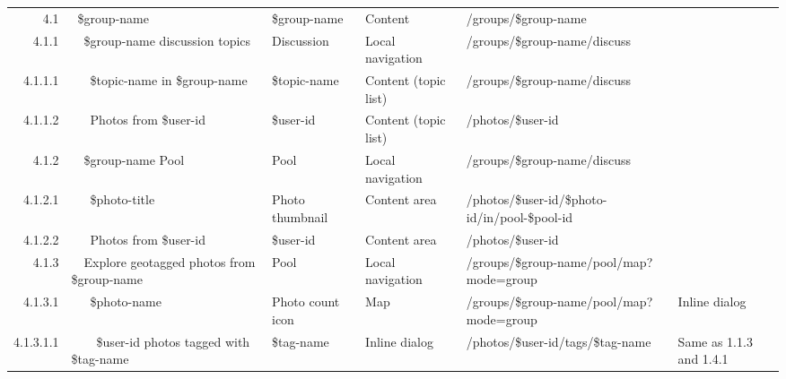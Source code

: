 \documentclass[12pt,a4paper]{article}
\begin{document}
\begin{landscape}
\begin{table}[h!b!p!]
\begin{center}
\begin{tiny}
\begin{tabular}{r|l|l|l|l|p{3cm}}
              4.1 &
              ~\$group-name &
              \$group-name &
              Content &
              /groups/\$group-name &
              \\

                4.1.1 &
                ~~\$group-name discussion topics &
                Discussion &
                Local navigation &
                /groups/\$group-name/discuss &
                \\

                  4.1.1.1 &
                  ~~~\$topic-name in \$group-name &
                  \$topic-name &
                  Content (topic list) &
                  /groups/\$group-name/discuss &
                  \\

                  4.1.1.2 &
                  ~~~Photos from \$user-id &
                  \$user-id &
                  Content (topic list) &
                  /photos/\$user-id &
                  \\

                4.1.2 &
                ~~\$group-name Pool &
                Pool &
                Local navigation &
                /groups/\$group-name/discuss &
                \\

                  4.1.2.1 &
                  ~~~\$photo-title &
                  Photo thumbnail &
                  Content area &
                  /photos/\$user-id/\$photo-id/in/pool-\$pool-id &
                  \\

                  4.1.2.2 &
                  ~~~Photos from \$user-id &
                  \$user-id &
                  Content area &
                  /photos/\$user-id &
                  \\

                4.1.3 &
                ~~Explore geotagged photos from \$group-name  &
                Pool &
                Local navigation &
                /groups/\$group-name/pool/map?mode=group &
                \\

                  4.1.3.1 &
                  ~~~\$photo-name &
                  Photo count icon &
                  Map &
                  /groups/\$group-name/pool/map?mode=group &
                  Inline dialog\\

                    4.1.3.1.1 &
                    ~~~~\$user-id photos tagged with \$tag-name &
                    \$tag-name &
                    Inline dialog &
                    /photos/\$user-id/tags/\$tag-name &
                    Same as 1.1.3 and 1.4.1\\


\end{tabular}
\end{tiny}
\end{center}
\end{table}
\end{landscape}
\end{document}
